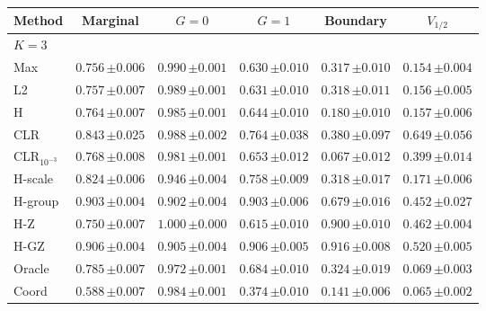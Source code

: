 \begin{tabular}{lccccc}\toprule
Method & Marginal & $G=0$ & $G=1$ & Boundary & $V_{1/2}$ \\\midrule
\multicolumn{6}{l}{$K=3$} \\
Max & $0.756\,{\scriptstyle\pm 0.006}$ & $0.990\,{\scriptstyle\pm 0.001}$ & $0.630\,{\scriptstyle\pm 0.010}$ & $0.317\,{\scriptstyle\pm 0.010}$ & $0.154\,{\scriptstyle\pm 0.004}$ \\
L2 & $0.757\,{\scriptstyle\pm 0.007}$ & $0.989\,{\scriptstyle\pm 0.001}$ & $0.631\,{\scriptstyle\pm 0.010}$ & $0.318\,{\scriptstyle\pm 0.011}$ & $0.156\,{\scriptstyle\pm 0.005}$ \\
H & $0.764\,{\scriptstyle\pm 0.007}$ & $0.985\,{\scriptstyle\pm 0.001}$ & $0.644\,{\scriptstyle\pm 0.010}$ & $0.180\,{\scriptstyle\pm 0.010}$ & $0.157\,{\scriptstyle\pm 0.006}$ \\
CLR & $0.843\,{\scriptstyle\pm 0.025}$ & $0.988\,{\scriptstyle\pm 0.002}$ & $0.764\,{\scriptstyle\pm 0.038}$ & $0.380\,{\scriptstyle\pm 0.097}$ & $0.649\,{\scriptstyle\pm 0.056}$ \\
CLR$_{10^{-3}}$ & $0.768\,{\scriptstyle\pm 0.008}$ & $0.981\,{\scriptstyle\pm 0.001}$ & $0.653\,{\scriptstyle\pm 0.012}$ & $0.067\,{\scriptstyle\pm 0.012}$ & $0.399\,{\scriptstyle\pm 0.014}$ \\
H-scale & $0.824\,{\scriptstyle\pm 0.006}$ & $0.946\,{\scriptstyle\pm 0.004}$ & $0.758\,{\scriptstyle\pm 0.009}$ & $0.318\,{\scriptstyle\pm 0.017}$ & $0.171\,{\scriptstyle\pm 0.006}$ \\
H-group & $0.903\,{\scriptstyle\pm 0.004}$ & $0.902\,{\scriptstyle\pm 0.004}$ & $0.903\,{\scriptstyle\pm 0.006}$ & $0.679\,{\scriptstyle\pm 0.016}$ & $0.452\,{\scriptstyle\pm 0.027}$ \\
H-Z & $0.750\,{\scriptstyle\pm 0.007}$ & $1.000\,{\scriptstyle\pm 0.000}$ & $0.615\,{\scriptstyle\pm 0.010}$ & $0.900\,{\scriptstyle\pm 0.010}$ & $0.462\,{\scriptstyle\pm 0.004}$ \\
H-GZ & $0.906\,{\scriptstyle\pm 0.004}$ & $0.905\,{\scriptstyle\pm 0.004}$ & $0.906\,{\scriptstyle\pm 0.005}$ & $0.916\,{\scriptstyle\pm 0.008}$ & $0.520\,{\scriptstyle\pm 0.005}$ \\
Oracle & $0.785\,{\scriptstyle\pm 0.007}$ & $0.972\,{\scriptstyle\pm 0.001}$ & $0.684\,{\scriptstyle\pm 0.010}$ & $0.324\,{\scriptstyle\pm 0.019}$ & $0.069\,{\scriptstyle\pm 0.003}$ \\
Coord & $0.588\,{\scriptstyle\pm 0.007}$ & $0.984\,{\scriptstyle\pm 0.001}$ & $0.374\,{\scriptstyle\pm 0.010}$ & $0.141\,{\scriptstyle\pm 0.006}$ & $0.065\,{\scriptstyle\pm 0.002}$ \\

\end{tabular}
